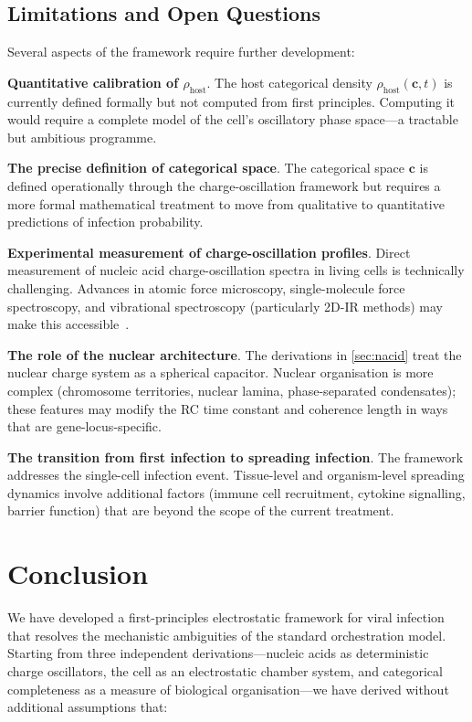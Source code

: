 \documentclass[12pt,a4paper]{article}
\theoremstyle{definition}
\theoremstyle{remark}
\newcommand{\Phost}{\rho_{\mathrm{host}}}
\newcommand{\vv}[1]{\boldsymbol{#1}}
\begin{document}
\subsection{Limitations and Open Questions}

Several aspects of the framework require further development:

\textbf{Quantitative calibration of $\Phost$}. The host categorical density $\Phost(\vv{c}, t)$ is currently defined formally but not computed from first principles. Computing it would require a complete model of the cell's oscillatory phase space---a tractable but ambitious programme.

\textbf{The precise definition of categorical space}. The categorical space $\vv{c}$ is defined operationally through the charge-oscillation framework but requires a more formal mathematical treatment to move from qualitative to quantitative predictions of infection probability.

\textbf{Experimental measurement of charge-oscillation profiles}. Direct measurement of nucleic acid charge-oscillation spectra in living cells is technically challenging. Advances in atomic force microscopy, single-molecule force spectroscopy, and vibrational spectroscopy (particularly 2D-IR methods) may make this accessible~\cite{Boxer2009,Oklejas2002}.

\textbf{The role of the nuclear architecture}. The derivations in \cref{sec:nacid} treat the nuclear charge system as a spherical capacitor. Nuclear organisation is more complex (chromosome territories, nuclear lamina, phase-separated condensates); these features may modify the RC time constant and coherence length in ways that are gene-locus-specific.

\textbf{The transition from first infection to spreading infection}. The framework addresses the single-cell infection event. Tissue-level and organism-level spreading dynamics involve additional factors (immune cell recruitment, cytokine signalling, barrier function) that are beyond the scope of the current treatment.

\section{Conclusion}
\label{sec:conclusion}

We have developed a first-principles electrostatic framework for viral infection that resolves the mechanistic ambiguities of the standard orchestration model. Starting from three independent derivations---nucleic acids as deterministic charge oscillators, the cell as an electrostatic chamber system, and categorical completeness as a measure of biological organisation---we have derived without additional assumptions that:
\end{document}
